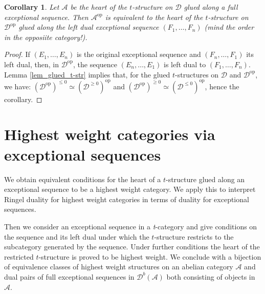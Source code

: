 \documentclass[12pt,a4paper]{amsart}
\newcommand{\aA}{{\mathcal{A}}}
\newcommand{\dD}{{\mathcal{D}}}
\newcommand{\kk}{\mathbbm{k}}
\newcommand{\tr}{{\mbox{$t$-struc}\-tu\-r}}
\newcommand{\opp}{\mathop{\textrm{op}}\nolimits}
\newtheorem{COR}[LEM]{Corollary}
\theoremstyle{definition}
\begin{document}
\begin{COR}\label{cor_dual_heart}
	Let $\aA$ be the heart of the \tr e on $\dD$ glued along a full exceptional sequence.
	Then $\aA^{\opp}$ is equivalent to the heart of the \tr e on $\dD^{\opp}$ glued along the left dual exceptional sequence $(F_1, \ldots, F_n)$ (mind the order in the opposiite category!).
\end{COR}
\begin{proof}
	If $(E_1, \ldots, E_n)$ is the original exceptional sequence and $(F_n, \ldots, F_1)$ its left dual, then,  in $\dD^{\opp}$, the sequence $(E_n, \ldots, E_1)$ is left dual to $(F_1, \ldots, F_n)$. Lemma \ref{lem_glued_t-str} implies that, for the glued \tr es on $\dD$ and $\dD^{\opp}$, we have: $(\dD^{\opp})^{\leq 0} \simeq (\dD^{\geq 0})^{\opp}$ and $(\dD^{\opp})^{\geq 0} \simeq (\dD^{\leq 0})^{\opp}$, hence the corollary. 
\end{proof}

\section{Highest weight categories via exceptional sequences}\label{sec_hwc_via_ex_col}



We obtain equivalent conditions for the heart of a \tr e glued along an exceptional sequence to be a highest weight category. We apply this to interpret Ringel duality for highest weight categories in terms of duality for exceptional sequences.  

Then we consider an exceptional sequence in a \textit{t}-category and give conditions on the sequence and its left dual under which the \tr e  restricts to the subcategory generated by the sequence. Under further conditions  the heart of the restricted \tr e  is proved to be highest weight. We conclude with a bijection of equivalence classes of highest weight structures on an abelian category $\aA$ and dual pairs of full exceptional sequences in $\dD^b(\aA)$ both consisting of objects in $\aA$. 
\end{document}
